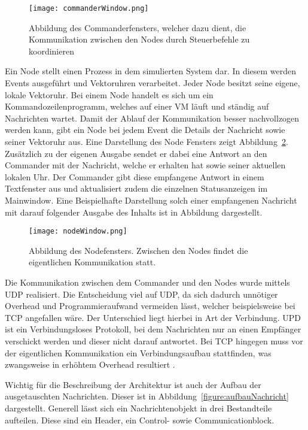 \begin{figure}[ht]
	\centering
	\texttt{[image: commanderWindow.png]}
	\caption[Commander Window]{Abbildung des Commanderfensters, welcher dazu dient, die Kommunikation zwischen den Nodes durch Steuerbefehle zu koordinieren}
	\label{figure:commanderWindow}
\end{figure}

Ein Node stellt einen Prozess in dem simulierten System dar. In diesem werden Events ausgeführt und Vektoruhren verarbeitet. Jeder Node besitzt seine eigene, lokale Vektoruhr. Bei einem Node handelt es sich um ein Kommandozeilenprogramm, welches auf einer VM läuft und ständig auf Nachrichten wartet. Damit der Ablauf der Kommunikation besser nachvollzogen werden kann, gibt ein Node bei jedem Event die Details der Nachricht sowie seiner Vektoruhr aus. Eine Darstellung des Node Fensters zeigt Abbildung~\ref{figure:nodeWindow}. Zusätzlich zu der eigenen Ausgabe sendet er dabei eine Antwort an den Commander mit der Nachricht, welche er erhalten hat sowie seiner aktuellen lokalen Uhr. Der Commander gibt diese empfangene Antwort in einem Textfenster aus und aktualisiert zudem die einzelnen Statusanzeigen im Mainwindow. Eine Beispielhafte Darstellung solch einer empfangenen Nachricht mit darauf folgender Ausgabe des Inhalts ist in Abbildung  dargestellt.

\begin{figure}[ht]
	\centering
	\texttt{[image: nodeWindow.png]}
	\caption[Node Window]{Abbildung des Nodefensters. Zwischen den Nodes findet die eigentlichen Kommunikation statt.}
\label{figure:nodeWindow}
\end{figure}

Die Kommunikation zwischen dem Commander und den Nodes wurde mittels UDP realisiert. Die Entscheidung viel auf UDP, da sich dadurch unnötiger Overhead und Programmieraufwand vermeiden lässt, welcher beispielsweise bei TCP angefallen wäre. Der Unterschied liegt hierbei in Art der Verbindung. UPD ist ein Verbindungsloses Protokoll, bei dem Nachrichten nur an einen Empfänger verschickt werden und dieser nicht darauf antwortet. Bei TCP hingegen muss vor der eigentlichen Kommunikation ein Verbindungsaufbau stattfinden, was zwangsweise in erhöhtem Overhead resultiert \cite*{Markert2013}.

Wichtig für die Beschreibung der Architektur ist auch der Aufbau der ausgetauschten Nachrichten. Dieser ist in Abbildung~\ref{figure:aufbauNachricht} dargestellt. Generell lässt sich ein Nachrichtenobjekt in drei Bestandteile aufteilen. Diese sind ein Header, ein Control- sowie Communicationblock. 

